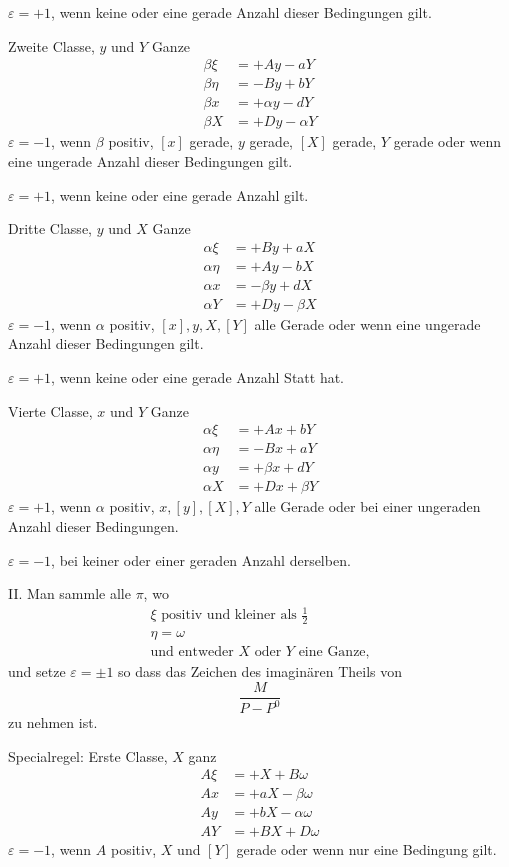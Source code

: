 $\varepsilon=+1$, wenn keine oder eine gerade Anzahl dieser Bedingungen gilt.

Zweite Classe, $y$ und $Y$ Ganze
\[
\begin{aligned}
\beta\xi&=+Ay-aY\\
\beta\eta&=-By+bY\\
\beta x&=+\alpha y-dY\\
\beta X&=+Dy-\alpha Y
\end{aligned}
\]
$\varepsilon=-1$, wenn $\beta$ positiv, $[x]$ gerade, $y$ gerade, $[X]$ gerade, $Y$ gerade oder wenn eine ungerade Anzahl dieser Bedingungen gilt.

$\varepsilon=+1$, wenn keine oder eine gerade Anzahl gilt.

Dritte Classe, $y$ und $X$ Ganze
\[
\begin{aligned}
\alpha\xi&=+By+aX\\
\alpha\eta&=+Ay-bX\\
\alpha x&=-\beta y+dX\\
\alpha Y&=+Dy-\beta X
\end{aligned}
\]
$\varepsilon=-1$, wenn $\alpha$ positiv, $[x],y,X,[Y]$ alle Gerade oder wenn eine ungerade Anzahl dieser Bedingungen gilt.

$\varepsilon=+1$, wenn keine oder eine gerade Anzahl Statt hat.

Vierte Classe, $x$ und $Y$ Ganze
\[
\begin{aligned}
\alpha\xi&=+Ax+bY\\
\alpha\eta&=-Bx+aY\\
\alpha y&=+\beta x+dY\\
\alpha X&=+Dx+\beta Y
\end{aligned}
\]
$\varepsilon=+1$, wenn $\alpha$ positiv, $x,[y],[X],Y$ alle Gerade oder bei einer ungeraden Anzahl dieser Bedingungen.

$\varepsilon=-1$, bei keiner oder einer geraden Anzahl derselben.

%
II. Man sammle alle $\pi$, wo
\[
\begin{array}{l}
\xi\text{ positiv und kleiner als }\frac12\\
\eta=\omega\\
\text{und entweder }X\text{ oder }Y\text{ eine Ganze,}
\end{array}
\]
und setze $\varepsilon=\pm1$ so dass das Zeichen des imaginären Theils von
\[
\frac{M}{P-P^0}
\]
zu nehmen ist.

Specialregel: Erste Classe, $X$ ganz
\[
\begin{aligned}
A\xi&=+X+B\omega\\
Ax&=+aX-\beta\omega\\
Ay&=+bX-\alpha\omega\\
AY&=+BX+D\omega
\end{aligned}
\]
$\varepsilon=-1$, wenn $A$ positiv, $X$ und $[Y]$ gerade oder wenn nur eine Bedingung gilt.

